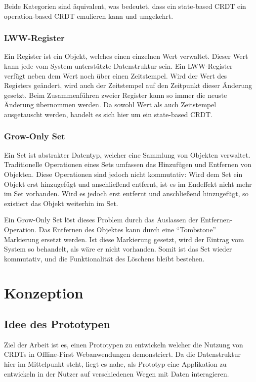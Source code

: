 \documentclass[a4paper, 12pt]{scrreprt}
\begin{document}
Beide Kategorien sind äquivalent\autocite[S. 9]{InproceedingsCRDTOriginal}, was bedeutet, dass ein state-based CRDT ein operation-based CRDT emulieren kann und umgekehrt.


\subsection{LWW-Register}
\sloppypar
Ein Register ist ein Objekt, welches einen einzelnen Wert verwaltet. Dieser Wert kann jede vom System unterstützte Datenstruktur sein. Ein \ac{LWW-Register} verfügt neben dem Wert noch über einen Zeitstempel. Wird der Wert des Registers geändert, wird auch der Zeitstempel auf den Zeitpunkt dieser Änderung gesetzt. Beim Zusammenführen zweier Register kann so immer die neuste Änderung übernommen werden. Da sowohl Wert als auch Zeitstempel ausgetauscht werden, handelt es sich hier um ein state-based CRDT.


\subsection{Grow-Only Set}
\label{sec:g-set}
Ein Set ist abstrakter Datentyp, welcher eine Sammlung von Objekten verwaltet. Traditionelle Operationen eines Sets umfassen das Hinzufügen und Entfernen von Objekten. Diese Operationen sind jedoch nicht kommutativ: Wird dem Set ein Objekt erst hinzugefügt und anschließend entfernt, ist es im Endeffekt nicht mehr im Set vorhanden. Wird es jedoch erst entfernt und anschließend hinzugefügt, so existiert das Objekt weiterhin im Set.

Ein Grow-Only Set löst dieses Problem durch das Auslassen der Entfernen-Operation. Das Entfernen des Objektes kann durch eine \enquote{Tombstone} Markierung ersetzt werden. Ist diese Markierung gesetzt, wird der Eintrag vom System so behandelt, als wäre er nicht vorhanden. Somit ist das Set wieder kommutativ, und die Funktionalität des Löschens bleibt bestehen. 



\chapter{Konzeption}

\section{Idee des Prototypen}
Ziel der Arbeit ist es, einen Prototypen zu entwickeln welcher die Nutzung von CRDTs in Offline-First Webanwendungen demonstriert. Da die Datenstruktur hier im Mittelpunkt steht, liegt es nahe, als Prototyp eine Applikation zu entwickeln in der Nutzer auf verschiedenen Wegen mit Daten interagieren.
\end{document}
